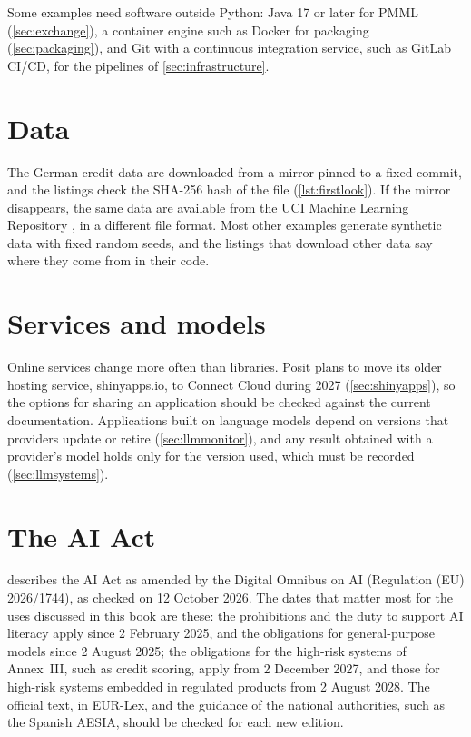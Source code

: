 Some examples need software outside Python: Java 17 or later for PMML (\cref{sec:exchange}), a
container engine such as Docker for packaging (\cref{sec:packaging}), and Git with a continuous
integration service, such as GitLab CI/CD, for the pipelines of \cref{sec:infrastructure}.

\section*{Data}

The German credit data are downloaded from a mirror pinned to a fixed commit,
and the listings check the SHA-256 hash of the file (\cref{lst:firstlook}). If the mirror disappears,
the same data are available from the UCI Machine Learning Repository \citep{hofmann1994statlog},
in a different file format. Most other examples generate synthetic data with fixed random seeds, and
the listings that download other data say where they come from in their code.

\section*{Services and models}

Online services change more often than libraries. Posit plans to move its older hosting service,
shinyapps.io, to Connect Cloud during 2027 (\cref{sec:shinyapps}), so the options for sharing an
application should be checked against the current documentation. Applications built on language
models depend on versions that providers update or retire (\cref{sec:llmmonitor}), and any result
obtained with a provider's model holds only for the version used, which must be recorded
(\cref{sec:llmsystems}).

\section*{The AI Act}

 describes the AI Act as amended by the Digital Omnibus on AI
(Regulation (EU) 2026/1744), as checked on 12 October 2026. The dates that matter most for the uses
discussed in this book are these: the prohibitions and the duty to support AI literacy apply since
2 February 2025, and the obligations for general-purpose models since 2 August 2025; the obligations
for the high-risk systems of Annex~III, such as credit scoring, apply from 2 December 2027, and those
for high-risk systems embedded in regulated products from 2 August 2028. The official text, in
EUR-Lex, and the guidance of the national authorities, such as the Spanish AESIA, should be checked
for each new edition.

